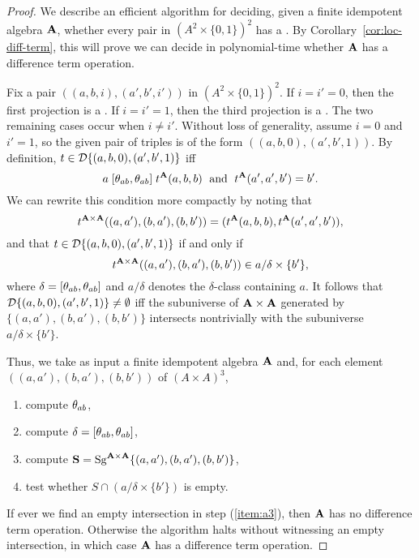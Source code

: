 \documentclass{ws-ijac}
\begin{document}
\begin{proof}
  We describe an efficient algorithm for deciding,
  given a finite idempotent algebra $\mathbf{A} $,
  whether every pair in $(A^2 \times \{0,1\})^2$
  has a \ldto.  By Corollary~\ref{cor:loc-diff-term}, this will prove we
  can decide in polynomial-time whether $\mathbf{A} $ has a difference term operation.

  Fix a pair
  $((a,b,i), (a',b',i'))$ in $(A^2 \times \{0,1\})^2$. If $i = i' = 0$,
  then the first projection is a \ldto. If $i = i' = 1$,
  then the third projection is a \ldto. The two remaining cases
  occur when $i\neq i'$. Without loss of generality, assume $i = 0$ and $i'=1$,
  so the given pair of triples is of the form $((a,b,0), (a',b',1))$.
  By definition, $t \in \mathcal{D} \{(a,b,0), (a',b',1)\}$ iff
  \[
  a\mathrel{[\theta_{ab}, \theta_{ab}]} t^{\mathbf{A} }(a,b,b) \; \text{ and } \;
  t^{\mathbf{A} }(a',a',b') = b'.
  \]
  We can rewrite this condition more compactly by noting that
  \[t^{\mathbf{A} \times \mathbf{A} }((a,a'), (b,a'), (b,b')) =
  (t^{\mathbf{A} }(a,b,b),t^{\mathbf{A} }(a',a',b')),\]
  and that
  $t \in \mathcal{D} \{(a,b,0), (a',b',1)\}$ if and only if
  \[
  t^{\mathbf{A} \times \mathbf{A} }((a,a'), (b,a'), (b,b'))\in a/\delta \times \{b'\},
  \]
  where $\delta = [\theta_{ab}, \theta_{ab}]$ and $a/\delta$ denotes the
  $\delta$-class containing $a$.
  It follows that $\mathcal{D} \{(a,b,0), (a',b',1)\} \neq \emptyset$
  iff the subuniverse of $\mathbf{A} \times \mathbf{A} $ generated by
  $\{(a,a'), (b,a'), (b,b')\}$ intersects nontrivially with the subuniverse
  $a/\delta \times \{b'\}$.

  Thus, we take as input a finite idempotent algebra $\mathbf{A} $ and,
  for each element $((a,a'), (b,a'), (b,b'))$ of $(A\times A)^3$,
  \begin{enumerate}
    \item compute $\theta_{ab}$,
    \item compute $\delta = [\theta_{ab}, \theta_{ab}]$,
    \item compute $\mathbf{S} = \operatorname{Sg}^{\mathbf{A} \times \mathbf{A} }\{(a,a'), (b,a'), (b,b')\}$,
    \item \label{item:a3} test whether $S \cap (a/\delta \times \{b'\})$ is empty.
  \end{enumerate}
  If ever we find an empty intersection in step (\ref{item:a3}), then
  $\mathbf{A} $ has no difference term operation.
  Otherwise the algorithm halts without witnessing an empty
  intersection, in which case $\mathbf{A} $ has a difference term operation.


\end{proof}
\end{document}
